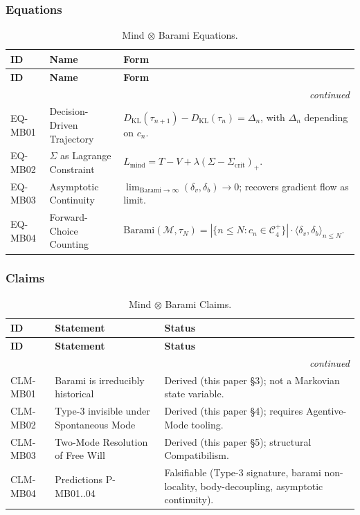 \documentclass[12pt, a4paper]{article}
\begin{document}
\subsubsection{Equations}

{\small
\renewcommand{\arraystretch}{1.30}
\begin{longtable}{@{}p{1.5cm} p{4.5cm} p{6.5cm}@{}}
\caption{Mind $\otimes$ Barami Equations.}\\
\toprule
\textbf{ID} & \textbf{Name} & \textbf{Form} \\
\midrule
\endfirsthead
\toprule
\textbf{ID} & \textbf{Name} & \textbf{Form} \\
\midrule
\endhead
\midrule \multicolumn{3}{r}{\emph{continued}}\\ \endfoot
\bottomrule \endlastfoot
EQ-MB01 & Decision-Driven Trajectory & $D_{\mathrm{KL}}(\tau_{n+1}) - D_{\mathrm{KL}}(\tau_n) = \Delta_n$, with $\Delta_n$ depending on $c_n$. \\
EQ-MB02 & $\Sigma$ as Lagrange Constraint & $L_{\mathrm{mind}} = T - V + \lambda(\Sigma - \Sigma_{\mathrm{crit}})_+$. \\
EQ-MB03 & Asymptotic Continuity & $\lim_{\mathrm{Barami} \to \infty} (\delta_v, \delta_b) \to 0$; recovers gradient flow as limit. \\
EQ-MB04 & Forward-Choice Counting & $\mathrm{Barami}(\mathcal{M}, \tau_N) = |\{n \le N : c_n \in \mathcal{C}_4^+\}| \cdot \langle \delta_v, \delta_b \rangle_{n \le N}$. \\
\end{longtable}
}

\subsubsection{Claims}

{\small
\renewcommand{\arraystretch}{1.30}
\begin{longtable}{@{}p{1.5cm} p{5.0cm} p{6.0cm}@{}}
\caption{Mind $\otimes$ Barami Claims.}\\
\toprule
\textbf{ID} & \textbf{Statement} & \textbf{Status} \\
\midrule
\endfirsthead
\toprule
\textbf{ID} & \textbf{Statement} & \textbf{Status} \\
\midrule
\endhead
\midrule \multicolumn{3}{r}{\emph{continued}}\\ \endfoot
\bottomrule \endlastfoot
CLM-MB01 & Barami is irreducibly historical & Derived (this paper §3); not a Markovian state variable. \\
CLM-MB02 & Type-3 invisible under Spontaneous Mode & Derived (this paper §4); requires Agentive-Mode tooling. \\
CLM-MB03 & Two-Mode Resolution of Free Will & Derived (this paper §5); structural Compatibilism. \\
CLM-MB04 & Predictions P-MB01..04 & Falsifiable (Type-3 signature, barami non-locality, body-decoupling, asymptotic continuity). \\
\end{longtable}
}
\end{document}
